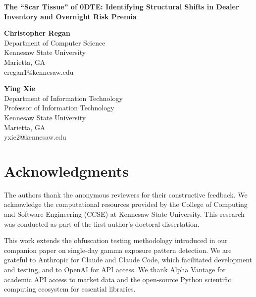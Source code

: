 \documentclass[12pt]{article}
\begin{document}
\begin{center}
{\Large\textbf{The ``Scar Tissue'' of 0DTE: Identifying Structural Shifts in Dealer Inventory and Overnight Risk Premia}}

\vspace{1cm}

\textbf{Christopher Regan}\\
Department of Computer Science\\
Kennesaw State University\\
Marietta, GA\\
cregan1@kennesaw.edu

\vspace{0.5cm}

\textbf{Ying Xie}\\
Department of Information Technology\\
Professor of Information Technology\\
Kennesaw State University\\
Marietta, GA\\
yxie2@kennesaw.edu

\end{center}

\vspace{1cm}

\section*{Acknowledgments}

The authors thank the anonymous reviewers for their constructive feedback. We acknowledge the computational resources provided by the College of Computing and Software Engineering (CCSE) at Kennesaw State University. This research was conducted as part of the first author's doctoral dissertation.

This work extends the obfuscation testing methodology introduced in our companion paper on single-day gamma exposure pattern detection. We are grateful to Anthropic for Claude and Claude Code, which facilitated development and testing, and to OpenAI for API access. We thank Alpha Vantage for academic API access to market data and the open-source Python scientific computing ecosystem for essential libraries.

\vspace{1cm}
\end{document}
